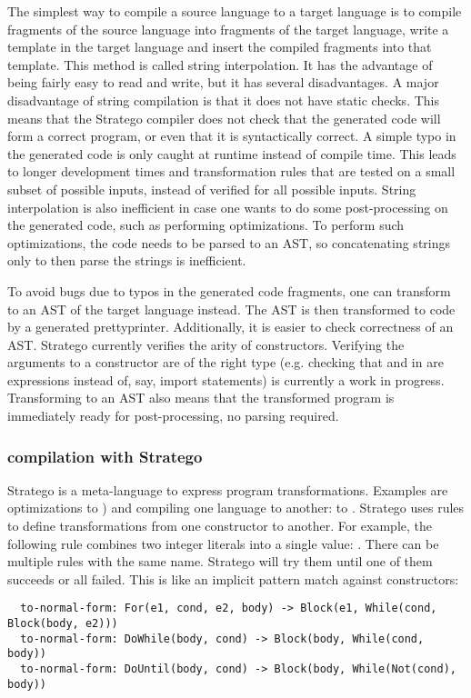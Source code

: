 The simplest way to compile a source language to a target language is to compile fragments of the source language into fragments of the target language, write a template in the target language and insert the compiled fragments into that template.
This method is called string interpolation.
It has the advantage of being fairly easy to read and write, but it has several disadvantages.
A major disadvantage of string compilation is that it does not have static checks.
This means that the Stratego compiler  does not check that the generated code will form a correct program, or even that it is syntactically correct.
A simple typo in the generated code is only caught at runtime instead of compile time.
This leads to longer development times and transformation rules that are tested on a small subset of possible inputs, instead of verified for all possible inputs.
String interpolation is also inefficient in case one wants to do some post-processing on the generated code, such as performing optimizations.
To perform such optimizations, the code needs to be parsed to an AST, so concatenating strings only to then parse the strings is inefficient.

To avoid bugs due to typos in the generated code fragments, one can transform to an AST of the target language instead.
The AST is then transformed to code by a generated prettyprinter.
Additionally, it is easier to check correctness of an AST.
Stratego currently verifies the arity of constructors.
Verifying the arguments to a constructor are of the right type (e.g. checking that  and  in  are expressions instead of, say, import statements) is currently a work in progress.
Transforming to an AST also means that the transformed program is immediately ready for post-processing, no parsing required.

\subsubsection{compilation with Stratego}
Stratego is a meta-language to express program transformations.
Examples are optimizations  to ) and compiling one language to another:  to .
Stratego uses rules to define transformations from one constructor to another.
For example, the following rule combines two integer literals into a single value: .
There can be multiple rules with the same name.
Stratego will try them until one of them succeeds or all failed.
This is like an implicit pattern match against constructors:
\begin{lstlisting}
  to-normal-form: For(e1, cond, e2, body) -> Block(e1, While(cond, Block(body, e2)))
  to-normal-form: DoWhile(body, cond) -> Block(body, While(cond, body))
  to-normal-form: DoUntil(body, cond) -> Block(body, While(Not(cond), body))
\end{lstlisting}

